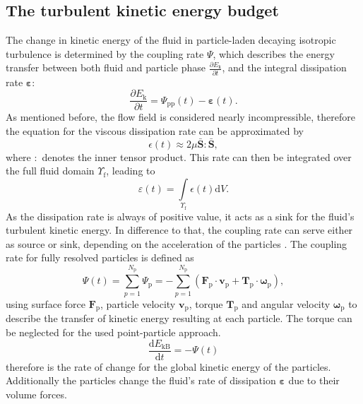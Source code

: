 \documentclass[11pt,a4paper,openany,oneside,parskip=half*]{article}
\renewcommand*\vec[1]{\boldsymbol{#1}}
\begin{document}
\subsection{The turbulent kinetic energy budget}
The change in kinetic energy of the fluid in particle-laden decaying isotropic turbulence is determined by the coupling rate $\Psi$, which describes the energy transfer between both fluid and particle phase $\frac{\partial E_\mathrm{k}}{\partial t}$, and the integral dissipation rate $\vec{\varepsilon}$:
\begin{equation}
\frac{\partial E_\mathrm{k}}{\partial t} = \Psi_\mathrm{pp} (t) - \vec{\varepsilon} (t).
\end{equation}
As mentioned before, the flow field is considered nearly incompressible, therefore the equation  for the viscous dissipation rate can be approximated by
\begin{equation}
 \epsilon (t) \approx 2 \mu \vec{\bar{S}}\vec{:}\vec{\bar{S}},
\end{equation}
where $\vec{:}$ denotes the inner tensor product. This rate can then be integrated over the full fluid domain $\Upsilon_\mathrm{f}$, leading to 
\begin{equation}
\varepsilon (t) = \int\limits_{\Upsilon_\mathrm{f}} \epsilon(t) \mathrm{d}V.
\end{equation}
As the dissipation rate is always of positive value, it acts as a sink for the fluid's turbulent kinetic energy. In difference to that, the coupling rate can serve either as source or sink, depending on the acceleration of the particles \cite{mechanismsoftwowaycoupling}. The coupling rate for fully resolved particles is defined as
\begin{equation}
\Psi (t) = \sum_{p=1}^{N_\mathrm{p}} \Psi_\mathrm{p}= - \sum_{p=1}^{N_\mathrm{p}} (\vec{F}_\mathrm{p} \cdot \vec{v}_\mathrm{p} + \vec{T}_\mathrm{p} \cdot \vec{\omega}_\mathrm{p}),
\end{equation}
using surface force $\vec{F}_\mathrm{p}$, particle velocity $\vec{v}_\mathrm{p}$, torque $\vec{T}_\mathrm{p}$ and angular velocity $\vec{\omega}_\mathrm{p}$ to describe the transfer of kinetic energy resulting at each particle. The torque can be neglected for the used point-particle approach.
\begin{equation}
\frac{\mathrm{d}E_\mathrm{kB}}{\mathrm{d}t} = - \Psi (t)
\end{equation}
therefore is the rate of change for the global kinetic energy of the particles.
Additionally the particles change the fluid's rate of dissipation $\vec{\varepsilon}$ due to their volume forces. 
\end{document}
